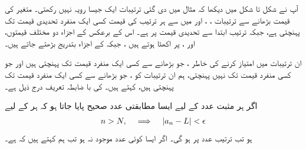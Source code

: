 آپ نے شکل  تا شکل  میں دیکھا کہ مثال  میں دی گئی ترتیبات ایک جیسا رویہ نہیں رکھتی۔  متغیر  کی قیمت بڑھانے سے ترتیبات ،  ، اور  میں  سے ہر  ترتیب کی قیمت کسی ایک منفرد تحدیدی قیمت تک پہنچتی ہے،  جبکہ ترتیب  ابتدا سے تحدیدی قیمت پر ہے۔ اس کے برعکس  کے اجزاء دو مختلف قیمتوں،  اور ، پر  اکھٹا  ہوتے ہیں ، جبکہ  کے اجزاء بتدریج بڑھتے جاتے ہیں۔ 

ان ترتیبات میں امتیاز کرنے کی خاطر ، جو  بڑھانے سے کسی ایک  منفرد قیمت  تک پہنچتی ہیں اور جو کسی منفرد قیمت تک نہیں پہنچتی، ہم ان ترتیبات کو ، جو  بڑھانے سے کسی ایک منفرد قیمت  تک پہنچتی ہیں،   کہتے ہیں۔  کی با ضابطہ تعریف درج ذیل ہے۔ 

اگر ہر مثبت عدد  کے لیے ایسا  مطابقتی عدد صحیح  پایا جاتا ہو کہ ہر  کے لیے
\begin{align*}
n>N,\quad \implies \quad \abs{a_n-L}<\epsilon
\end{align*}
ہو تب ترتیب  عدد  پر  ہو گی۔ اگر ایسا کوئی عدد  موجود نہ ہو تب ہم کہتے ہیں کہ   ہے۔

